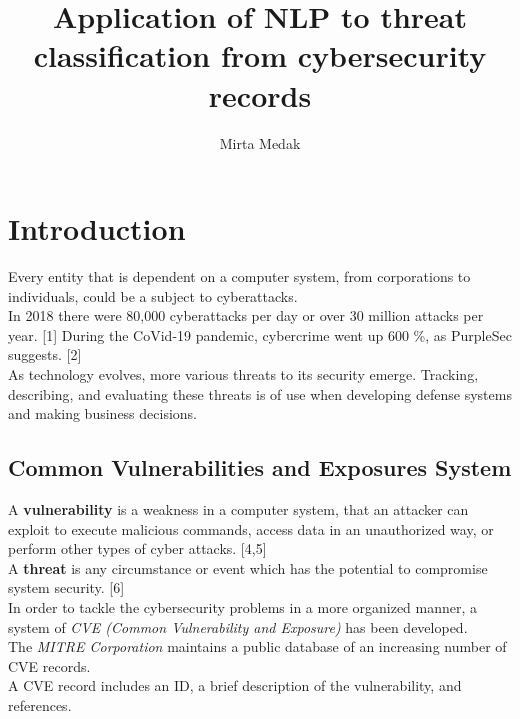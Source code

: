 \documentclass[times, utf8, zavrsni, english]{fer}
\begin{document}

\title{Application of NLP to threat classification from cybersecurity records}

\author{Mirta Medak}

\maketitle

\izvornik

\zahvala{}

\tableofcontents

\chapter{Introduction}
Every entity that is dependent on a computer system, from corporations to individuals, could be a subject to cyberattacks. \\
In 2018 there were 80,000 cyberattacks per day or over 30 million attacks per year. [1] During the CoVid-19 pandemic, cybercrime went up 600 \%, as PurpleSec suggests. [2] \\
As technology evolves, more various threats to its security emerge.
Tracking, describing, and evaluating these threats is of use when developing defense systems and making business decisions. \\

\section{Common Vulnerabilities and Exposures System}
A \textbf{vulnerability} is a weakness in a computer system, that an attacker can exploit to execute malicious commands, access data in an unauthorized way, or perform other types of cyber attacks. [4,5] \\
A \textbf{threat} is any circumstance or event which has the potential to compromise system security. [6] \\
In order to tackle the cybersecurity problems in a more organized manner, a system of \emph{CVE (Common Vulnerability and Exposure)} has been developed. \\
The \emph{MITRE Corporation} maintains a public database of an increasing number of CVE records. \\
A CVE record includes an ID, a brief description of the vulnerability, and references.
\end{document}
